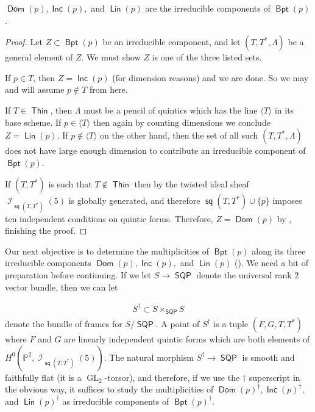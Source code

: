 \documentclass{article}
\renewcommand{\P}{\mathbb{P}}
\DeclareMathOperator{\I}{\mathcal{I}}
\DeclareMathOperator{\Thin}{\mathsf{Thin}}
\DeclareMathOperator{\SQP}{\mathsf{SQP}}
\DeclareMathOperator{\s}{\mathsf{sq}}
\DeclareMathOperator{\BP}{\mathsf{Bpt}}
\DeclareMathOperator{\Dom}{\mathsf{Dom}}
\DeclareMathOperator{\Lin}{\mathsf{Lin}}
\DeclareMathOperator{\Inc}{\mathsf{Inc}}
\DeclareMathOperator{\GL}{GL}
\begin{document}
\begin{lemma}
    \label{lemma:threecomponents} $\Dom(p), \Inc(p),$ and $\Lin(p)$ are the irreducible components of $\BP(p)$.
\end{lemma}

\begin{proof}
    Let $Z \subset \BP(p)$ be an irreducible component, and let $(T,T^{*},\Lambda)$ be a general element of $Z$.  We must show $Z$ is one of the three listed sets.
    
    If $p \in T$, then $Z = \Inc(p)$ (for dimension reasons) and we are done.  So we may and will assume $p \notin T$ from here.  

    If $T \in \Thin$, then $\Lambda$ must be a pencil of quintics which has the line $\langle T\rangle$ in its base scheme. If $p \in \langle T \rangle$ then again by counting dimensions we conclude $Z = \Lin(p)$.  If $p \notin \langle T \rangle$ on the other hand, then the set of all such $(T,T^{*},\Lambda)$ does not have large enough dimension to contribute an irreducible component of $\BP(p)$.

    If $(T,T^{*})$ is such that $T \notin \Thin$ then by  the twisted ideal sheaf $\I_{\s(T,T^{*})}(5)$ is globally generated, and therefore $\s(T,T^{*}) \cup \{p\}$ imposes ten independent conditions on quintic forms.  Therefore, $Z = \Dom(p)$ by , finishing the proof.    
\end{proof} 

Our next objective is to determine the multiplicities of $\BP(p)$ along its three irreducible components $\Dom(p), \Inc(p),$ and $\Lin(p)$ ().   We need a bit of preparation before continuing.  If we let $S \to \SQP$ denote the universal rank $2$ vector bundle, then we can let  

\begin{eqnarray}
    S^{\dagger} \subset S \times _{\SQP}S
\end{eqnarray}
denote the bundle of frames for $S/\SQP$.  A point of $S^{\dagger}$ is a tuple $(F,G,T,T^{*})$ where $F$ and $G$ are linearly independent quintic forms which are both elements of $H^{0}\left(\P^{2}, \I_{\s(T,T^{*})}(5)\right)$.  The natural morphism $S^{\dagger} \to \SQP$ is smooth and faithfully flat (it is a $\GL_{2}$-torsor), and therefore, if we use the $\dagger$ superscript in the obvious way, it suffices to study the multiplicities of $\Dom(p)^{\dagger}, \Inc(p)^{\dagger},$ and $\Lin(p)^{\dagger}$ as irreducible components of $\BP(p)^{\dagger}$.  
\end{document}
